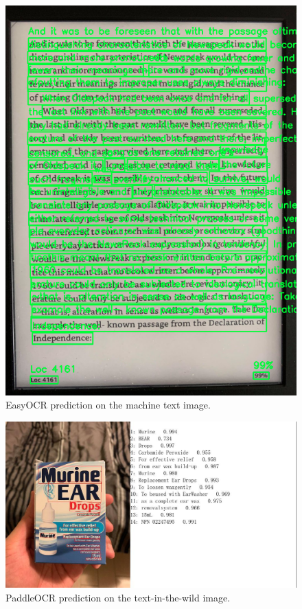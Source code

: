 \documentclass[a4paper,11pt]{article}
\begin{document}
\begin{figure}[H]
\centering
\includegraphics[scale=0.4]{img/ocr_testing/kindle_easyocr.png}
\caption{EasyOCR prediction on the machine text image.}
\label{fig:kindle_easyocr}
\end{figure}

\begin{figure}[H]
\centering
\includegraphics[scale=0.45]{img/ocr_testing/eardrop_paddleocr.jpg}
\caption{PaddleOCR prediction on the text-in-the-wild image.}
\label{fig:eardrop_paddleocr}
\end{figure}
\end{document}
